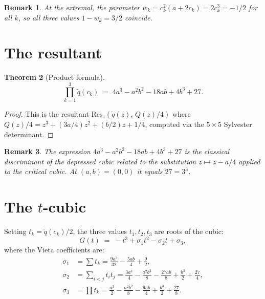\documentclass[11pt,a4paper]{article}
\newtheorem{theorem}{Theorem}[section]
\newtheorem{remark}[theorem]{Remark}
\begin{document}
\begin{remark}
At the extremal, the parameter $w_k = c_k^2 (a + 2c_k) = 2c_k^3 = -1/2$ for all $k$, so all three values $1 - w_k = 3/2$ coincide.
\end{remark}

\section{The resultant}

\begin{theorem}[Product formula]
\begin{equation}
\prod_{k=1}^3 \tilde{q}(c_k) \;=\; 4a^3 - a^2 b^2 - 18 ab + 4b^3 + 27.
\end{equation}
\end{theorem}

\begin{proof}
This is the resultant $\mathrm{Res}_z(\tilde{q}(z),\, Q(z)/4)$ where $Q(z)/4 = z^3 + (3a/4)z^2 + (b/2)z + 1/4$, computed via the $5 \times 5$ Sylvester determinant.
\end{proof}

\begin{remark}
The expression $4a^3 - a^2 b^2 - 18 ab + 4b^3 + 27$ is the classical \emph{discriminant} of the depressed cubic related to the substitution $z \mapsto z - a/4$ applied to the critical cubic. At $(a, b) = (0, 0)$ it equals $27 = 3^3$.
\end{remark}

\section{The $t$-cubic}

Setting $t_k = \tilde{q}(c_k)/2$, the three values $t_1, t_2, t_3$ are roots of the cubic:
\begin{equation}
G(t) \;=\; -t^3 + \sigma_1 t^2 - \sigma_2 t + \sigma_3,
\end{equation}
where the Vieta coefficients are:
\begin{align}
\sigma_1 &= \sum t_k = \frac{9 a^3}{32} - \frac{5 ab}{4} + \frac{9}{2}, \\
\sigma_2 &= \sum_{i < j} t_i t_j = \frac{3 a^3}{4} - \frac{a^2 b^2}{8} - \frac{27 ab}{8} + \frac{b^3}{2} + \frac{27}{4}, \\
\sigma_3 &= \prod t_k = \frac{a^3}{2} - \frac{a^2 b^2}{8} - \frac{9 ab}{4} + \frac{b^3}{2} + \frac{27}{8}.
\end{align}
\end{document}
